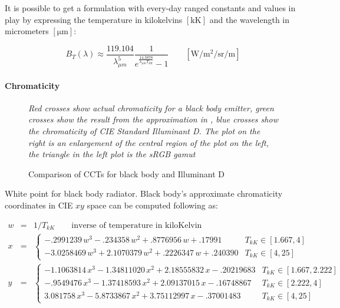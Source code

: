 It is possible to get a formulation with every-day ranged constants and values in play by expressing the temperature in kilokelvins $[\si{\kilo\kelvin}]$ and the wavelength in micrometers $[\si{\micro\meter}]$:

\begin{equation}
B_T(\lambda) \approx \frac{119.104}{\lambda_{\mu m}^5} \frac
1{e^{\frac{14.3878}{\lambda_{\mu m} T_{kK}}}-1}
\qquad \left[\si{\watt\per\square\meter\per\steradian\per\meter}\right]
\end{equation}

\paragraph{Chromaticity}

\begin{figure}
{
\centering
\begin{minipage}{.4\textwidth}

\end{minipage}
\begin{minipage}{.4\textwidth}

\end{minipage}

\caption{Comparison of CCTs for black body and Illuminant D}
\label{fig:blackbodychroma}
}
\vskip 1mm
{\footnotesize\it Red crosses show actual chromaticity for a black body
emitter, green crosses show the result from the approximation in
\cite{kang02}, blue crosses show the chromaticity of CIE Standard
Illuminant D. The plot on the right is an enlargement of the
central region of the plot on the left, the triangle in the left plot
is the sRGB gamut}
\end{figure}

White point for black body radiator. Black body's approximate chromaticity
coordinates in CIE $xy$ space can be computed following \cite{kang02} as:

\begin{equation}
\begin{array}{rcll}
w & = & 1/T_{kK} \qquad \text{inverse of temperature in kiloKelvin} & \\
x & = & \begin{cases}
     - .2991239\,w^3 -  .234358 \,w^2  +  .8776956\,w  + .17991  & T_{kK} \in [1.667, 4] \\
     -3.0258469\,w^3 + 2.1070379\,w^2  +  .2226347\,w  + .240390 & T_{kK} \in [4, 25]
    \end{cases} \\
y & = & \begin{cases}
     -1.1063814\,x^3 - 1.34811020\,x^2 + 2.18555832\,x - .20219683 & T_{kK} \in [1.667, 2.222] \\
     - .9549476\,x^3 - 1.37418593\,x^2 + 2.09137015\,x - .16748867 & T_{kK} \in [2.222, 4] \\
      3.081758 \,x^3 - 5.8733867 \,x^2 + 3.75112997\,x - .37001483 & T_{kK} \in [4, 25]
      \end{cases}
\end{array}
\end{equation}

